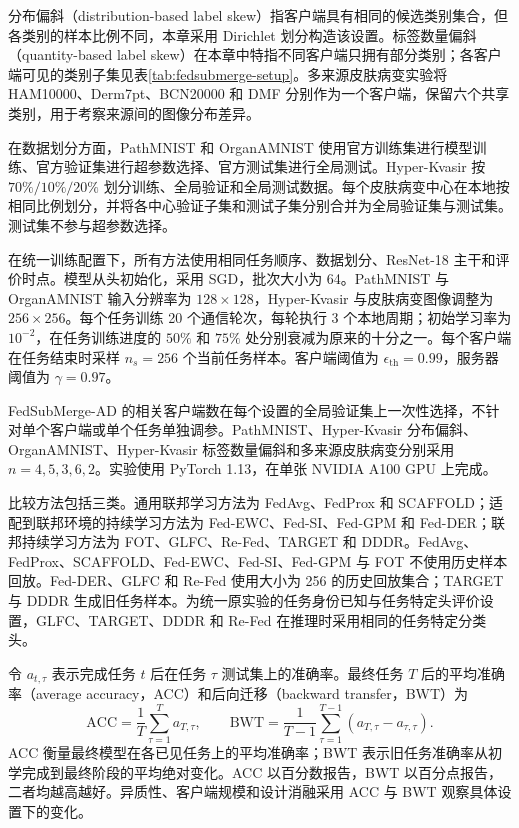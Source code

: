 分布偏斜（distribution-based label skew）指客户端具有相同的候选类别集合，但各类别的样本比例不同，本章采用 Dirichlet 划分构造该设置\cite{hsu2019dirichlet}。标签数量偏斜（quantity-based label skew）在本章中特指不同客户端只拥有部分类别；各客户端可见的类别子集见表\ref{tab:fedsubmerge-setup}。多来源皮肤病变实验将 HAM10000、Derm7pt、BCN20000 和 DMF 分别作为一个客户端，保留六个共享类别，用于考察来源间的图像分布差异。

在数据划分方面，PathMNIST 和 OrganAMNIST 使用官方训练集进行模型训练、官方验证集进行超参数选择、官方测试集进行全局测试。Hyper-Kvasir 按 $70\%/10\%/20\%$ 划分训练、全局验证和全局测试数据。每个皮肤病变中心在本地按相同比例划分，并将各中心验证子集和测试子集分别合并为全局验证集与测试集。测试集不参与超参数选择。

在统一训练配置下，所有方法使用相同任务顺序、数据划分、ResNet-18 主干和评价时点\cite{he2016resnet}。模型从头初始化，采用 SGD，批次大小为 64。PathMNIST 与 OrganAMNIST 输入分辨率为 $128\times128$，Hyper-Kvasir 与皮肤病变图像调整为 $256\times256$。每个任务训练 20 个通信轮次，每轮执行 3 个本地周期；初始学习率为 $10^{-2}$，在任务训练进度的 $50\%$ 和 $75\%$ 处分别衰减为原来的十分之一。每个客户端在任务结束时采样 $n_s=256$ 个当前任务样本。客户端阈值为 $\epsilon_{\mathrm{th}}=0.99$，服务器阈值为 $\gamma=0.97$。

FedSubMerge-AD 的相关客户端数在每个设置的全局验证集上一次性选择，不针对单个客户端或单个任务单独调参。PathMNIST、Hyper-Kvasir 分布偏斜、OrganAMNIST、Hyper-Kvasir 标签数量偏斜和多来源皮肤病变分别采用 $n=4,5,3,6,2$。实验使用 PyTorch 1.13，在单张 NVIDIA A100 GPU 上完成。

比较方法包括三类。通用联邦学习方法为 FedAvg、FedProx 和 SCAFFOLD\cite{mcmahan2017fedavg,li2020fedprox,karimireddy2020scaffold}；适配到联邦环境的持续学习方法为 Fed-EWC、Fed-SI、Fed-GPM 和 Fed-DER\cite{kirkpatrick2017ewc,method_regu_si,saha2021gpm,method_replay_der}；联邦持续学习方法为 FOT、GLFC、Re-Fed、TARGET 和 DDDR\cite{bakman2024fot,dong2022glfc,li2024Refed,zhang2023target,liang2024dddr}。FedAvg、FedProx、SCAFFOLD、Fed-EWC、Fed-SI、Fed-GPM 与 FOT 不使用历史样本回放。Fed-DER、GLFC 和 Re-Fed 使用大小为 256 的历史回放集合；TARGET 与 DDDR 生成旧任务样本。为统一原实验的任务身份已知与任务特定头评价设置，GLFC、TARGET、DDDR 和 Re-Fed 在推理时采用相同的任务特定分类头。

令 $a_{t,\tau}$ 表示完成任务 $t$ 后在任务 $\tau$ 测试集上的准确率。最终任务 $T$ 后的平均准确率（average accuracy，ACC）和后向迁移（backward transfer，BWT）为\cite{method_replay_gem}
\begin{equation}
\mathrm{ACC}
=
\frac{1}{T}\sum_{\tau=1}^{T}a_{T,\tau},
\qquad
\mathrm{BWT}
=
\frac{1}{T-1}\sum_{\tau=1}^{T-1}
\left(a_{T,\tau}-a_{\tau,\tau}\right).
\label{eq:fedsubmerge-acc-bwt}
\end{equation}
ACC 衡量最终模型在各已见任务上的平均准确率；BWT 表示旧任务准确率从初学完成到最终阶段的平均绝对变化。ACC 以百分数报告，BWT 以百分点报告，二者均越高越好。异质性、客户端规模和设计消融采用 ACC 与 BWT 观察具体设置下的变化。

